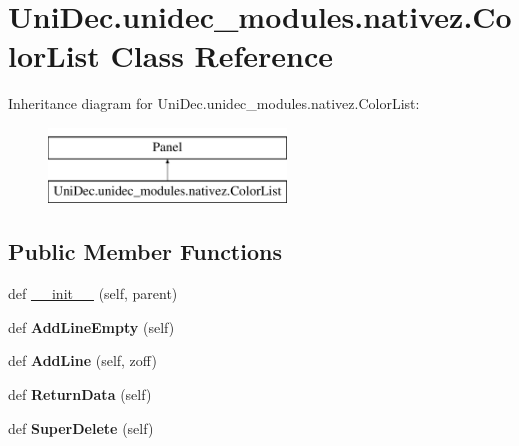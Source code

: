 \hypertarget{class_uni_dec_1_1unidec__modules_1_1nativez_1_1_color_list}{}\section{Uni\+Dec.\+unidec\+\_\+modules.\+nativez.\+Color\+List Class Reference}
\label{class_uni_dec_1_1unidec__modules_1_1nativez_1_1_color_list}
Inheritance diagram for Uni\+Dec.\+unidec\+\_\+modules.\+nativez.\+Color\+List\+:\begin{figure}[H]
\begin{center}
\leavevmode
\includegraphics[height=2.000000cm]{class_uni_dec_1_1unidec__modules_1_1nativez_1_1_color_list}
\end{center}
\end{figure}
\subsection*{Public Member Functions}
\begin{DoxyCompactItemize}
\item 
def \hyperlink{class_uni_dec_1_1unidec__modules_1_1nativez_1_1_color_list_adac31bf7b03956b7f7fbe8401402ca8e}{\+\_\+\+\_\+init\+\_\+\+\_\+} (self, parent)
\item 
\hypertarget{class_uni_dec_1_1unidec__modules_1_1nativez_1_1_color_list_ad93df668109c000d45880584c0fe5d10}{}def {\bfseries Add\+Line\+Empty} (self)\label{class_uni_dec_1_1unidec__modules_1_1nativez_1_1_color_list_ad93df668109c000d45880584c0fe5d10}

\item 
\hypertarget{class_uni_dec_1_1unidec__modules_1_1nativez_1_1_color_list_a7531481f4b1c8ebdf773d778e654a5c2}{}def {\bfseries Add\+Line} (self, zoff)\label{class_uni_dec_1_1unidec__modules_1_1nativez_1_1_color_list_a7531481f4b1c8ebdf773d778e654a5c2}

\item 
\hypertarget{class_uni_dec_1_1unidec__modules_1_1nativez_1_1_color_list_a010947b68c07a7d28a870a753bffb2bd}{}def {\bfseries Return\+Data} (self)\label{class_uni_dec_1_1unidec__modules_1_1nativez_1_1_color_list_a010947b68c07a7d28a870a753bffb2bd}

\item 
\hypertarget{class_uni_dec_1_1unidec__modules_1_1nativez_1_1_color_list_a4c57ad090363d4b83ff47507b7006b9c}{}def {\bfseries Super\+Delete} (self)\label{class_uni_dec_1_1unidec__modules_1_1nativez_1_1_color_list_a4c57ad090363d4b83ff47507b7006b9c}

\end{DoxyCompactItemize}
